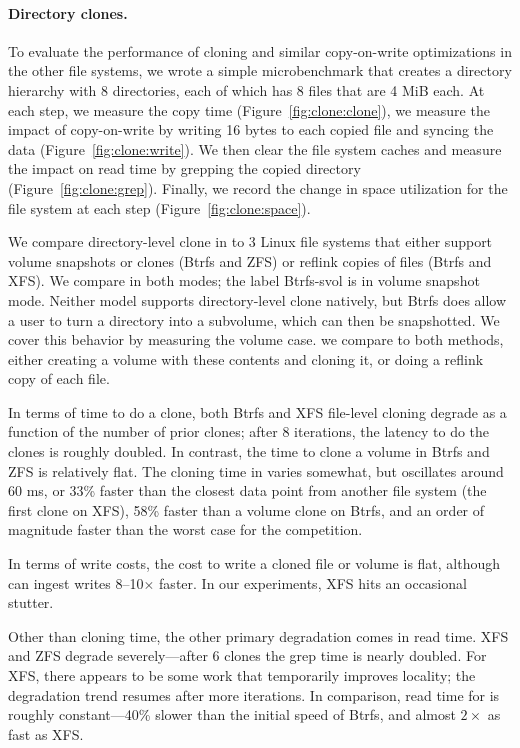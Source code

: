 \paragraph{Directory clones.}
To evaluate the performance of cloning and similar copy-on-write optimizations
in the other file systems,
we wrote a simple microbenchmark that creates a directory hierarchy with 8
directories, each of which has 8 files that are 4 MiB each.
At each step, we measure the copy time (Figure~\ref{fig:clone:clone}),
we measure the impact of copy-on-write by writing 16 bytes to each copied file
and syncing the data (Figure~\ref{fig:clone:write}).
We then clear the file system caches and measure the impact on read time by
grepping the copied directory (Figure~\ref{fig:clone:grep}).
Finally, we record the change in space utilization for the file system at each
step (Figure~\ref{fig:clone:space}).

We compare directory-level clone in \betrfs to 3 Linux file systems that either
support volume snapshots or clones (Btrfs and ZFS)
or reflink copies of files (Btrfs and XFS).
We compare in both modes; the label Btrfs-svol is in volume snapshot mode.
Neither model supports directory-level clone natively, but Btrfs does allow a
user to turn a directory into a subvolume, which can then be snapshotted.
We cover this behavior by measuring the volume case.
we compare to both methods, either creating a volume with these contents and
cloning it, or doing a reflink copy of each file.

In terms of time to do a clone, both Btrfs and XFS file-level cloning degrade as
a function of the number of prior clones;
after 8 iterations, the latency to do the clones is roughly doubled.
In contrast, the time to clone a volume in Btrfs and ZFS is relatively flat.
The cloning time in \betrfsFive varies somewhat, but oscillates around 60 ms, or
33\% faster than the closest data point from another file system
(the first clone on XFS), 58\% faster than a volume clone on Btrfs,
and an order of magnitude faster than the worst case for the competition.

In terms of write costs, the cost to write a cloned file or volume is flat,
although \betrfsFive can ingest writes 8--10$\times$ faster.
In our experiments, XFS hits an occasional stutter.

Other than cloning time, the other primary degradation comes in read time.
XFS and ZFS degrade severely---after 6 clones the grep time is nearly doubled.
For XFS, there appears to be some work that temporarily improves locality;
the degradation trend resumes after more iterations.
In comparison, read time for \betrfsFive is roughly constant---40\% slower than
the initial speed of Btrfs, and almost $2\times$ as fast as XFS.

